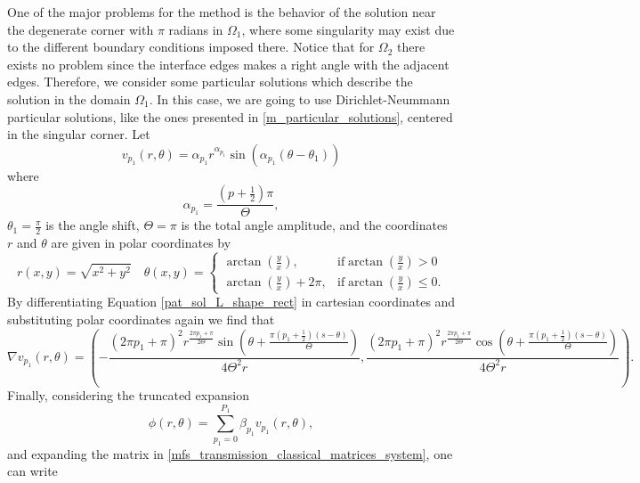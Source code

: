 One of the major problems for the method is the behavior of the solution near the degenerate corner with \(\pi\) radians in \(\Omega_1\), where some singularity may exist due to the different boundary conditions imposed there. Notice that for \(\Omega_2\) there exists no problem since the interface edges makes a right angle with the adjacent edges. Therefore, we consider some particular solutions which describe the solution in the domain \(\Omega_1\). In this case, we are going to use Dirichlet-Neummann particular solutions, like the ones presented in \ref{m_particular_solutions}, centered in the singular corner. Let
\begin{equation}\label{pat_sol_L_shape_rect}
    v_{p_1}(r, \theta) = \alpha_{p_1} r^{\alpha_{p_1}} \sin(\alpha_{p_1}(\theta - \theta_1))
\end{equation}
where
\[
    \alpha_{p_1} = \frac{(p+\frac{1}{2})\pi}{\Theta},
\]
\(\theta_1 = \frac{\pi}{2}\) is the angle shift, \(\Theta = \pi\) is the total angle amplitude,  and the coordinates \(r\) and \(\theta\) are given in polar coordinates by
\[
    r(x,y) = \sqrt{x^2+y^2} \quad \theta(x,y)=\begin{cases}
        \arctan(\frac{y}{x}),& \text{if} \arctan(\frac{y}{x})>0\\
        \arctan(\frac{y}{x})+2\pi,& \text{if} \arctan(\frac{y}{x})\leq0.
    \end{cases}
\]
By differentiating Equation \eqref{pat_sol_L_shape_rect} in cartesian coordinates and substituting polar coordinates again we find that
\begin{equation*}
    \nabla v_{p_1}(r, \theta) = \left(-\frac{(2 \pi  {p_1}+\pi )^2 r^{\frac{2 \pi  {p_1}+\pi }{2 \Theta }} \sin \left(\theta +\frac{\pi  \left(p_1+\frac{1}{2}\right) (s-\theta )}{\Theta }\right)}{4 \Theta ^2 r},\frac{(2 \pi  p_1+\pi )^2 r^{\frac{2 \pi  p_1+\pi }{2 \Theta }} \cos \left(\theta +\frac{\pi  \left(p_1+\frac{1}{2}\right) (s-\theta )}{\Theta }\right)}{4 \Theta ^2 r}\right).
\end{equation*}
Finally, considering the truncated expansion
\begin{equation}\label{num_particular_L_shape_rect_equation}
    \phi(r,\theta)=\sum_{p_1=0}^{P_1} \beta_{p_1} v_{p_1}(r, \theta),
\end{equation}
and expanding the matrix in \eqref{mfs_transmission_classical_matrices_system}, one can write
